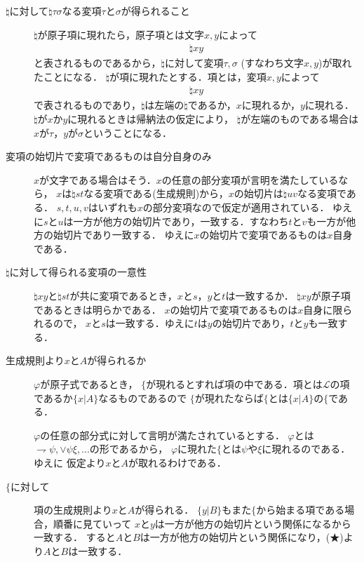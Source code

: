 \documentclass[a4j,10.5pt,oneside,openany]{jsbook}
\theoremstyle{mystyle}
\begin{document}
	\begin{description}
		\item[$\natural$に対して$\natural \tau \sigma$なる変項$\tau$と$\sigma$が得られること]
			$\natural$が原子項に現れたら，原子項とは文字$x,y$によって
			\begin{align}
				\natural xy
			\end{align}
			と表されるものであるから，$\natural$に対して変項$\tau,\sigma$ (すなわち文字$x,y$)が取れたことになる．
			$\natural$が項に現れたとする．項とは，変項$x,y$によって
			\begin{align}
				\natural xy
			\end{align}
			で表されるものであり，$\natural$は左端の$\natural$であるか，$x$に現れるか，$y$に現れる．
			$\natural$が$x$か$y$に現れるときは帰納法の仮定により，
			$\natural$が左端のものである場合は$x$が$\tau$，$y$が$\sigma$ということになる．
			
		\item[変項の始切片で変項であるものは自分自身のみ]
			$x$が文字である場合はそう．$x$の任意の部分変項が言明を満たしているなら，
			$x$は$\natural st$なる変項である(生成規則)から，$x$の始切片は$\natural uv$なる変項である．
			$s,t,u,v$はいずれも$x$の部分変項なので仮定が適用されている．
			ゆえに$s$と$u$は一方が他方の始切片であり，一致する．すなわち$t$と$v$も一方が他方の始切片であり一致する．
			ゆえに$x$の始切片で変項であるものは$x$自身である．
			
		\item[$\natural$に対して得られる変項の一意性]
			$\natural xy$と$\natural st$が共に変項であるとき，$x$と$s$，$y$と$t$は一致するか．
			$\natural xy$が原子項であるときは明らかである．
			$x$の始切片で変項であるものは$x$自身に限られるので，
			$x$と$s$は一致する．ゆえに$t$は$y$の始切片であり，$t$と$y$も一致する．
		
		\item[生成規則より$x$と$A$が得られるか]
			$\varphi$が原子式であるとき，
			$\{$が現れるとすれば項の中である．項とは$\mathcal{L}$の項であるか$\{x|A\}$なるものであるので
			$\{$が現れたならば$\{$とは$\{x|A\}$の$\{$である．
			
			$\varphi$の任意の部分式に対して言明が満たされているとする．
			$\varphi$とは$\rightharpoondown \psi,\vee \psi \xi,...$の形であるから，
			$\varphi$に現れた$\{$とは$\psi$や$\xi$に現れるのである．ゆえに
			仮定より$x$と$A$が取れるわけである．
			
		\item[$\{$に対して]
			項の生成規則より$x$と$A$が得られる．
			$\{y|B\}$もまた$\{$から始まる項である場合，順番に見ていって
			$x$と$y$は一方が他方の始切片という関係になるから一致する．
			すると$A$と$B$は一方が他方の始切片という関係になり，(★)より$A$と$B$は一致する．
			

\end{description}
\end{document}
